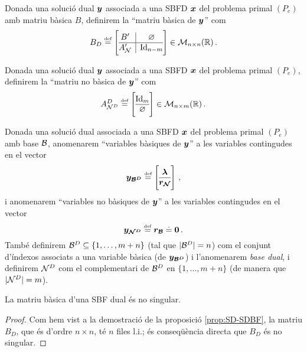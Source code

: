 \begin{defi*}\label{defi:mbd}
	Donada una solució dual $\boldsymbol{y}$ associada a una SBFD $\boldsymbol{x}$ del problema primal $(P_e)$ amb matriu bàsica $B$, definirem la ``matriu bàsica de $\boldsymbol{y}$'' com
	\[
		B_D \defeq \left[
		\begin{array}{@{}c|c@{}}
			B'	  &	\varnothing	\\
			\hline
			A_\N' & \Id_{n-m}
		\end{array}
		\right]
		\in \matspace_{n\times n}(\real)  \,.
	\]
\end{defi*}

\begin{defi*}
	Donada una solució dual $\boldsymbol{y}$ associada a una SBFD $\boldsymbol{x}$ del problema primal $(P_e)$, definirem la ``matriu no bàsica de  $\boldsymbol{y}$'' com
	\[
		A^D_{\N^D} \defeq 
		\left[
		\begin{array}{@{}c@{}}
			\Id_m \\
			\hline
			\varnothing
		\end{array}
		\right]
		\in \matspace_{n\times m}(\real)\,.
	\]
\end{defi*}

\begin{defi*}\label{defi:vd}
	Donada una solució dual associada a una SBFD $\boldsymbol{x}$ del problema primal $(P_e)$ amb base $\mathcal{B}$, anomenarem ``variables bàsiques de $\boldsymbol{y}$'' a les variables contingudes en el vector
	\[
		\vb{y_{\B^D}} \defeq
		\left[\begin{array}{@{}c@{}}
			\vb{\lambda}\\
			\hline
			\vb{r_\N}
		\end{array}\right]\,,
	\]
	i anomenarem ``variables no bàsiques de $\boldsymbol{y}$'' a les variables contingudes en el vector
	\[
		\boldsymbol{y_{\mathcal{N}^D}} \stackrel{\text{\tiny def}}{=} \boldsymbol{r_{\mathcal{B}}} \doteq \boldsymbol{0}\,.
	\]
	També definirem $\mathcal{B}^D \subseteq \{1,\ldots, m+n\}$ (tal que $|\mathcal{B}^D| = n$) com el conjunt d'índexos associats a una variable bàsica (de $\boldsymbol{y_{\mathcal{B}^D}}$) i l'anomenarem \textit{base dual}, i definirem $\mathcal{N}^D$ com el complementari de $\mathcal{B}^D$ en $\{1,\ldots,m+n\}$ (de manera que $|\mathcal{N}^D|=m$).
\end{defi*}

\begin{prop}
	La matriu bàsica d'una SBF dual és no singular.
	\begin{proof}
		Com hem vist a la demostració de la proposició \ref{prop:SD-SDBF}, la matriu $B_D$, que és d'ordre $n\times n$, té $n$ files l.i.; és conseqüència directa que $B_D$ és no singular.
	\end{proof}
\end{prop}

